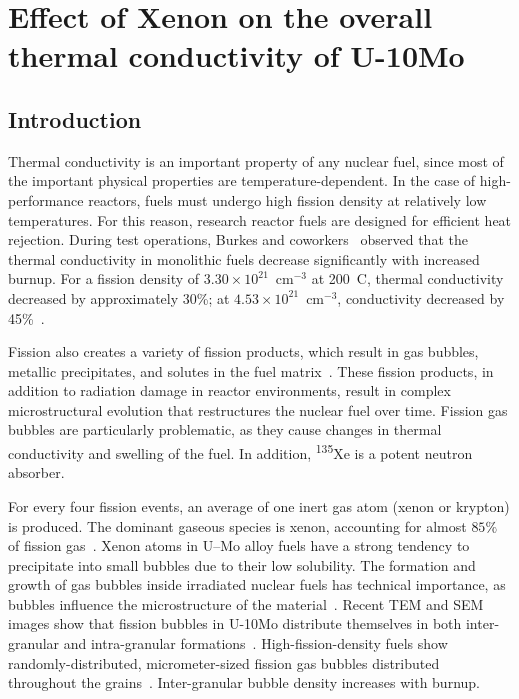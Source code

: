 \chapter{Effect of Xenon on the overall thermal conductivity of U-10Mo}

\section{Introduction}\label{sec:introduction_ch1}
Thermal conductivity is an important property of any nuclear fuel, since most of the important physical properties are temperature-dependent. In the case of high-performance reactors, fuels must undergo high fission density at relatively low temperatures. For this reason, research reactor fuels are designed for efficient heat rejection. During test operations, Burkes and coworkers~\cite{burkes2015thermal} observed that the thermal conductivity in monolithic fuels decrease significantly with increased burnup. For a fission density of $3.30\times10^{21}$~cm$^{-3}$ at 200~\textdegree C, thermal conductivity decreased by approximately 30\%; at $4.53\times10^{21}$~cm$^{-3}$, conductivity decreased by 45\%~\cite{burkes2015thermal}.

Fission also creates a variety of fission products, which result in gas bubbles, metallic precipitates, and solutes in the fuel matrix~\cite{rondinella2010high}. These fission products, in addition to radiation damage in reactor environments, result in complex microstructural evolution that restructures the nuclear fuel over time. Fission gas bubbles are particularly problematic, as they cause changes in thermal conductivity and swelling of the fuel. In addition, \textsuperscript{135}Xe is a potent neutron absorber.

For every four fission events, an average of one inert gas atom (xenon or krypton) is produced. The dominant gaseous species is xenon, accounting for almost $85\%$ of fission gas~\cite{blades1956ratio,petruska1955absolute}. Xenon atoms in U--Mo alloy fuels have a strong tendency to precipitate into small bubbles due to their low solubility. The formation and growth of gas bubbles inside irradiated nuclear fuels has technical importance, as bubbles influence the microstructure of the material~\cite{kim2011fission}. Recent TEM and SEM images show that fission bubbles in U-10Mo distribute themselves in both inter-granular and intra-granular formations~\cite{miller2015transmission,miller2012advantages, gan2010transmission, gan2012tem}. High-fission-density fuels show randomly-distributed, micrometer-sized fission gas bubbles distributed throughout the grains~\cite{gan2012tem}. Inter-granular bubble density increases with burnup. 

